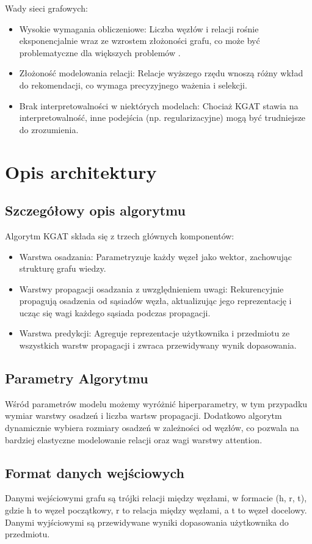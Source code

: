 \documentclass[a4paper,onecolumn]{LTJournalArticle}
\begin{document}
Wady sieci grafowych:
\begin{itemize}
	\item Wysokie wymagania obliczeniowe: Liczba węzłów i relacji rośnie eksponencjalnie wraz ze wzrostem złożoności grafu, co może być problematyczne dla większych problemów  \cite{kipf2017semi}.
	\item Złożoność modelowania relacji: Relacje wyższego rzędu \cite{hamilton2017inductive} wnoszą różny wkład do rekomendacji, co wymaga precyzyjnego ważenia i selekcji.
	\item Brak interpretowalności w niektórych modelach: Chociaż KGAT stawia na interpretowalność, inne podejścia (np. regularizacyjne) mogą być trudniejsze do zrozumienia.
\end{itemize}
\section{Opis architektury}
\subsection{Szczegółowy opis algorytmu}
	
Algorytm KGAT składa się z trzech głównych komponentów:
\begin{itemize}
	\item Warstwa osadzania: Parametryzuje każdy węzeł jako wektor, zachowując strukturę grafu wiedzy.
	\item Warstwy propagacji osadzania z uwzględnieniem uwagi: Rekurencyjnie propagują osadzenia od sąsiadów węzła, aktualizując jego reprezentację i ucząc się wagi każdego sąsiada podczas propagacji.
	\item Warstwa predykcji: Agreguje reprezentacje użytkownika i przedmiotu ze wszystkich warstw propagacji i zwraca przewidywany wynik dopasowania.
\end{itemize}
\subsection{Parametry Algorytmu}
Wśród parametrów modelu możemy wyróżnić hiperparametry, w tym przypadku wymiar warstwy osadzeń i liczba wartsw propagacji. Dodatkowo algorytm dynamicznie wybiera rozmiary
osadzeń w zależności od węzłów, co pozwala na bardziej elastyczne modelowanie relacji oraz wagi warstwy attention.
\subsection{Format danych wejściowych}
Danymi wejściowymi grafu są trójki relacji między węzłami, w formacie (h, r, t), gdzie h to węzeł początkowy, r to relacja między węzłami, a t to węzeł docelowy.\\
Danymi wyjściowymi są przewidywane wyniki dopasowania użytkownika do przedmiotu.
\end{document}
